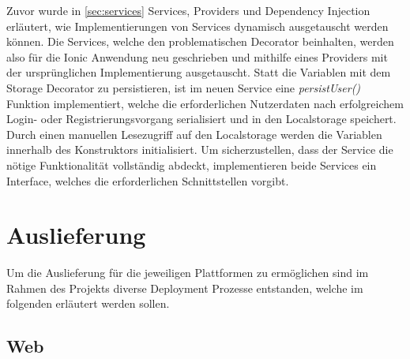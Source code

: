 Zuvor wurde in \ref{sec:services} Services, Providers und Dependency Injection erläutert, wie
Implementierungen von Services dynamisch ausgetauscht werden können.
Die Services, welche den problematischen Decorator beinhalten, werden also für die Ionic Anwendung neu geschrieben
und mithilfe eines Providers mit der ursprünglichen Implementierung ausgetauscht.
Statt die Variablen mit dem Storage Decorator zu persistieren, ist im neuen Service eine \emph{persistUser()} Funktion implementiert, welche die erforderlichen Nutzerdaten nach
erfolgreichem Login- oder Registrierungsvorgang serialisiert und in den Localstorage speichert.
Durch einen manuellen Lesezugriff auf den Localstorage werden die Variablen innerhalb des Konstruktors initialisiert.
Um sicherzustellen, dass der Service die nötige Funktionalität vollständig abdeckt, implementieren beide Services ein Interface,
welches die erforderlichen Schnittstellen vorgibt.

\vspace{0.3cm}





\newpage
\section{Auslieferung}

Um die Auslieferung für die jeweiligen Plattformen zu ermöglichen
sind im Rahmen des Projekts \projectname{} diverse Deployment Prozesse entstanden,
welche im folgenden erläutert werden sollen.

\subsection{Web}
\label{deployment-web}

